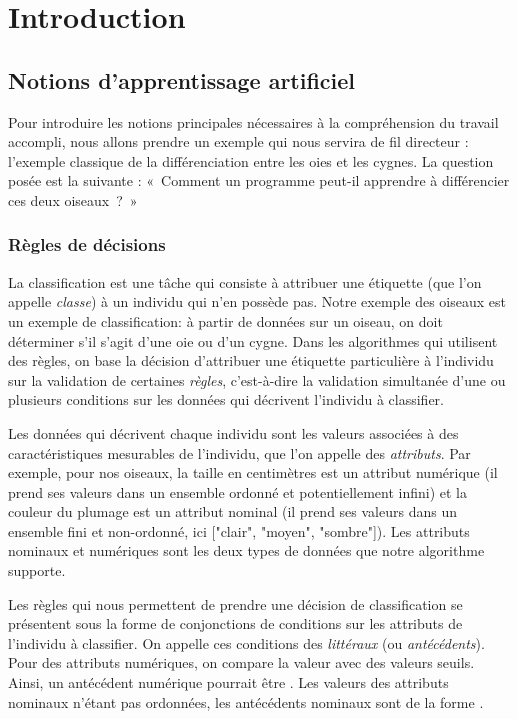 \section{Introduction}

    \subsection{Notions d'apprentissage artificiel}

        Pour introduire les notions principales nécessaires à la compréhension du travail accompli, nous allons prendre un exemple qui nous servira de fil directeur : l’exemple classique de la différenciation entre les oies et les cygnes. La question posée est la suivante : «~Comment un programme peut-il apprendre à différencier ces deux oiseaux~?~»

        \subsubsection{Règles de décisions}

            La classification est une tâche qui consiste à attribuer une étiquette (que l'on appelle \emph{classe}) à un individu qui n'en possède pas. Notre exemple des oiseaux est un exemple de classification: à partir de données sur un oiseau, on doit déterminer s'il s'agit d'une oie ou d'un cygne. Dans les algorithmes qui utilisent des règles, on base la décision d'attribuer une étiquette particulière à l'individu sur la validation de certaines \emph{règles}, c'est-à-dire la validation simultanée d'une ou plusieurs conditions sur les données qui décrivent l'individu à classifier.

            Les données qui décrivent chaque individu sont les valeurs associées à des caractéristiques mesurables de l'individu, que l'on appelle des \emph{attributs}. Par exemple, pour nos oiseaux, la taille en centimètres est un attribut numérique (il prend ses valeurs dans un ensemble ordonné et potentiellement infini) et la couleur du plumage est un attribut nominal (il prend ses valeurs dans un ensemble fini et non-ordonné, ici ["clair", "moyen", "sombre"]). Les attributs nominaux et numériques sont les deux types de données que notre algorithme supporte.

            Les règles qui nous permettent de prendre une décision de classification se présentent sous la forme de conjonctions de conditions sur les attributs de l'individu à classifier. On appelle ces conditions des \emph{littéraux} (ou \emph{antécédents}). Pour des attributs numériques, on compare la valeur avec des valeurs seuils. Ainsi, un antécédent numérique pourrait être . Les valeurs des attributs nominaux n'étant pas ordonnées, les antécédents nominaux sont de la forme .

